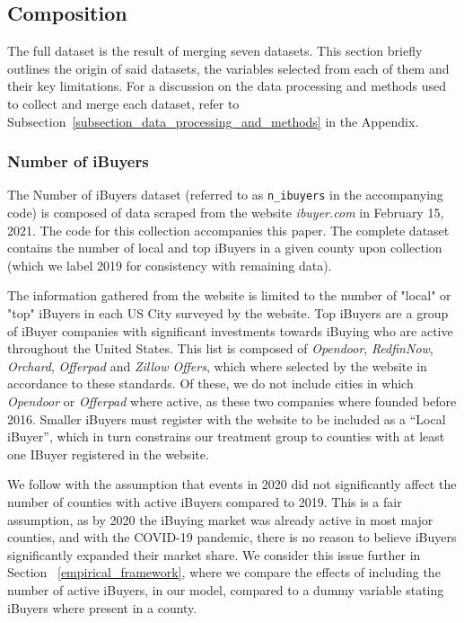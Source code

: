 \subsection{Composition}\label{subsection_composition}
The full dataset is the result of merging seven datasets. This section briefly outlines the origin of said datasets, the variables selected from each of them and their key limitations. For a discussion on the data processing and methods used to collect and merge each dataset, refer to Subsection~\ref{subsection_data_processing_and_methods} in the Appendix.

\subsubsection{Number of iBuyers}\label{subsubsec_n_ibuyers}
The Number of iBuyers dataset (referred to as \lstinline{n_ibuyers} in the accompanying code) is composed of data scraped from the website \textit{ibuyer.com}\cite{ibuyer} in February 15, 2021. The code for this collection accompanies this paper. The complete dataset contains the number of local and top iBuyers in a given county upon collection (which we label 2019 for consistency with remaining data). 

The information gathered from the website is limited to the number of "local" or "top" iBuyers in each US City surveyed by the website. Top iBuyers are a group of iBuyer companies with significant investments towards iBuying who are active throughout the United States. This list is composed of \textit{Opendoor}, \textit{RedfinNow}, \textit{Orchard}, \textit{Offerpad} and \textit{Zillow Offers}, which where selected by the website in accordance to these standards. Of these, we do not include cities in which \textit{Opendoor} or \textit{Offerpad} where active, as these two companies where founded before 2016. Smaller iBuyers must register with the website to be included as a ``Local iBuyer'', which in turn constrains our treatment group to counties with at least one IBuyer registered in the website. 

We follow with the assumption that events in 2020 did not significantly affect the number of counties with active iBuyers compared to 2019. This is a fair assumption, as by 2020 the iBuying market was already active in most major counties, and with the COVID-19 pandemic, there is no reason to believe iBuyers significantly expanded their market share. We consider this issue further in Section ~\ref{empirical_framework}, where we compare the effects of including the number of active iBuyers, in our model, compared to a dummy variable stating iBuyers where present in a county.


